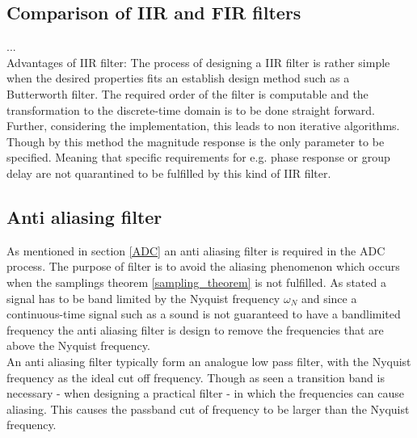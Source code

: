   

\subsection{Comparison of IIR and FIR filters}
... \\
Advantages of IIR filter:
The process of designing a IIR filter is rather simple when the desired properties fits an establish design method such as a Butterworth filter. The required order of the filter is computable and the transformation to the discrete-time domain is to be done straight forward. Further, considering the implementation, this leads to non iterative algorithms. \\
Though by this method the magnitude response is the only parameter to be specified. Meaning that specific requirements for e.g. phase response or group delay are not quarantined to be fulfilled by this kind of IIR filter.

\subsection{Anti aliasing filter}
As mentioned in section \ref{ADC} an anti aliasing filter is required in the ADC process. The purpose of filter is to avoid the aliasing phenomenon which occurs when the samplings theorem \ref{sampling_theorem} is not fulfilled. As stated a signal has to be band limited by the Nyquist frequency $\omega_N$ and since a continuous-time signal such as a sound is not guaranteed to have a bandlimited frequency the anti aliasing filter is design to remove the frequencies that are above the Nyquist frequency. \\
An anti aliasing filter typically form an analogue low pass filter, with the Nyquist frequency as the ideal cut off frequency. Though as seen a transition band is necessary - when designing a practical filter - in which the frequencies can cause aliasing. This causes the passband cut of frequency to be larger than the Nyquist frequency.           


